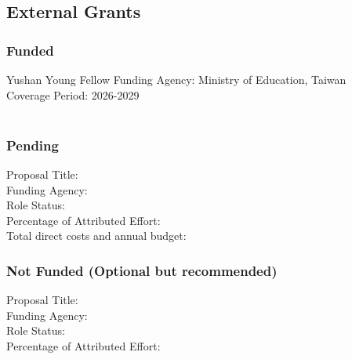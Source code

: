 \documentclass[a4paper,9pt]{extarticle}
\newenvironment{subs} %
  {\adjustwidth{2em}{0pt}}
  {\endadjustwidth}
\begin{document}
    \subsection*{External Grants}
    \begin{subs}
        \subsubsection*{Funded}
            Yushan Young Fellow
            Funding Agency: Ministry of Education, Taiwan \\
            Coverage Period: 2026-2029 \\
			\\                 
            
        \subsubsection*{Pending}
            Proposal Title:\\
            Funding Agency:\\
            Role Status: \\
            Percentage of Attributed Effort: \\
            Total direct costs and annual budget:
        \subsubsection*{Not Funded (Optional but recommended)}
            Proposal Title:\\
            Funding Agency:\\
            Role Status: \\
            Percentage of Attributed Effort: 
    \end{subs}
\end{document}

